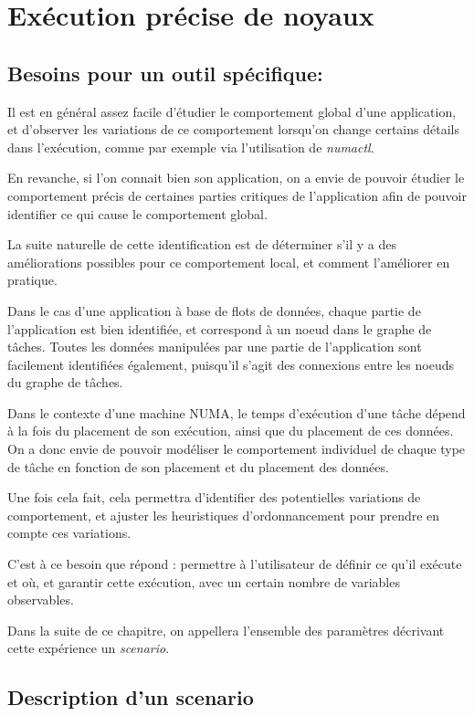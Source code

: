 \section{Exécution précise de noyaux}\label{sec:contribs:outil}

\subsection{Besoins pour un outil spécifique: \outil}

Il est en général assez facile d'étudier le comportement global d'une application, et d'observer les variations de ce comportement lorsqu'on change certains détails dans l'exécution, comme par exemple via l'utilisation de \emph{numactl}.

En revanche, si l'on connait bien son application, on a envie de pouvoir étudier le comportement précis de certaines parties critiques de l'application afin de pouvoir identifier ce qui cause le comportement global.

La suite naturelle de cette identification est de déterminer s'il y a des améliorations possibles pour ce comportement local, et comment l'améliorer en pratique.

Dans le cas d'une application à base de flots de données, chaque partie de l'application est bien identifiée, et correspond à un noeud dans le graphe de tâches.
Toutes les données manipulées par une partie de l'application sont facilement identifiées également, puisqu'il s'agit des connexions entre les noeuds du graphe de tâches.

Dans le contexte d'une machine NUMA, le temps d'exécution d'une tâche dépend à la fois du placement de son exécution, ainsi que du placement de ces données. On a donc envie de pouvoir modéliser le comportement individuel de chaque type de tâche en fonction de son placement et du placement des données.

Une fois cela fait, cela permettra d'identifier des potentielles variations de comportement, et ajuster les heuristiques d'ordonnancement pour prendre en compte ces variations.

C'est à ce besoin que répond \outil : permettre à l'utilisateur de définir ce qu'il exécute et où, et garantir cette exécution, avec un certain nombre de variables observables.

Dans la suite de ce chapitre, on appellera l'ensemble des paramètres décrivant cette expérience un \emph{scenario}.

\subsection{Description d'un scenario}

